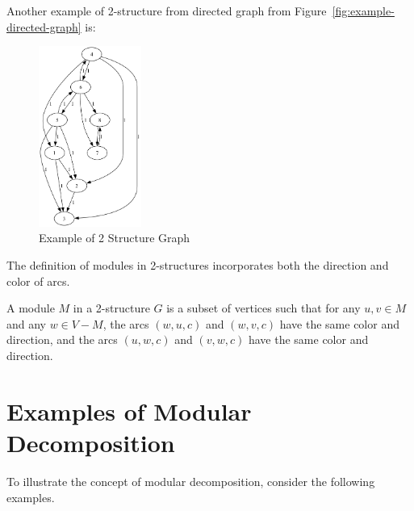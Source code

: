 Another example of 2-structure from directed graph from Figure~\ref{fig:example-directed-graph} is:
\begin{myex}
    \begin{figure}[!h]
        \centering
        \includegraphics[width=0.30\textwidth]{images/graphs/digraph_ex1}
        \caption{Example of 2 Structure Graph}
        \label{fig:2-structure-graph-example}
    \end{figure}
\end{myex}


The definition of modules in 2-structures incorporates both the direction and color of arcs.

\begin{mydef}
    A module $M$ in a 2-structure $G$ is a subset of vertices such that for any $u, v \in M$ and any $w \in V - M$, the arcs $(w, u, c)$ and $(w, v, c)$ have the same color and direction, and the arcs $(u, w, c)$ and $(v, w, c)$ have the same color and direction.
\end{mydef}


\section{Examples of Modular Decomposition}\label{sec:examples-of-modular-decomposition}

To illustrate the concept of modular decomposition, consider the following examples.


